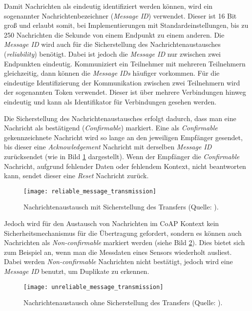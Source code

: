 Damit Nachrichten als eindeutig identifiziert werden können, wird ein sogenannter Nachrichtenbezeichner (\textit{Message ID}) verwendet. Dieser ist 16 Bit groß und erlaubt somit, bei Implementierungen mit Standardeinstellungen, bis zu 250 Nachrichten die Sekunde von einem Endpunkt zu einem anderen. Die \textit{Message ID} wird auch für die Sicherstellung des Nachrichtenaustausches (\textit{reliability}) benötigt. Dabei ist jedoch die \textit{Message ID} nur zwischen zwei Endpunkten eindeutig. Kommuniziert ein Teilnehmer mit mehreren Teilnehmern gleichzeitig, dann können die \textit{Message IDs} häufiger vorkommen. Für die eindeutige Identifizierung der Kommunikation zwischen zwei Teilnehmern wird der sogenannten Token verwendet. Dieser ist über mehrere Verbindungen hinweg eindeutig und kann als Identifikator für Verbindungen gesehen werden.

Die Sicherstellung des Nachrichtenaustausches erfolgt dadurch, dass man eine Nachricht als bestätigend (\textit{Confirmable}) markiert. Eine als \textit{Confirmable} gekennzeichnete Nachricht wird so lange an den jeweiligen Empfänger gesendet, bis dieser eine \textit{Acknowledgement} Nachricht mit derselben \textit{Message ID} zurücksendet (wie in Bild \ref{fig:nachrichtenaustausch-mit-sicherstellung-des-transfers} dargestellt). Wenn der Empfänger die \textit{Confirmable} Nachricht, aufgrund fehlender Daten oder fehlendem Kontext, nicht beantworten kann, sendet dieser eine \textit{Reset} Nachricht zurück.

\begin{figure}[h]
    \centering
    \texttt{[image: reliable\_message\_transmission]}
    \caption{Nachrichtenaustausch mit Sicherstellung des Transfers (Quelle: \autocite{RFC7252}).}
    \label{fig:nachrichtenaustausch-mit-sicherstellung-des-transfers}
\end{figure}

Jedoch wird für den Austausch von Nachrichten im CoAP Kontext kein Sicherheitsmechanismus für die Übertragung gefordert, sondern es können auch Nachrichten als \textit{Non-confirmable} markiert werden (siehe Bild \ref{fig:nachrichtenaustausch-ohne-sicherstellung-des-transfers}). Dies bietet sich zum Beispiel an, wenn man die Messdaten eines Sensors wiederholt ausliest. Dabei werden \textit{Non-confirmable} Nachrichten nicht bestätigt, jedoch wird eine \textit{Message ID} benutzt, um Duplikate zu erkennen.

\begin{figure}[h]
    \centering
    \texttt{[image: unreliable\_message\_transmission]}
    \caption{Nachrichtenaustausch ohne Sicherstellung des Transfers (Quelle: \autocite{RFC7252}).}
    \label{fig:nachrichtenaustausch-ohne-sicherstellung-des-transfers}
\end{figure}

